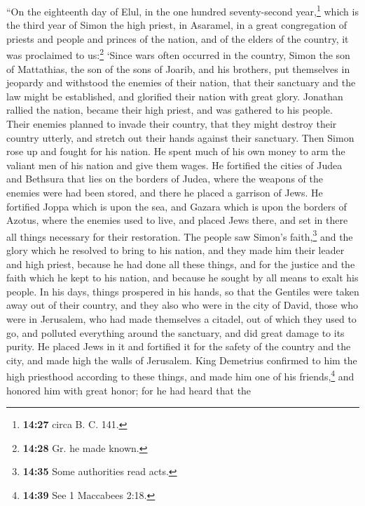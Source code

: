 ``On the eighteenth day of Elul, in the one hundred seventy-second
year,\footnote{\textbf{14:27} circa B. C. 141.} which is the third year
of Simon the high priest,  in Asaramel, in a great
congregation of priests and people and princes of the nation, and of the
elders of the country, it was proclaimed to us:\footnote{\textbf{14:28}
  Gr. he made known.}  `Since wars often occurred in the
country, Simon the son of Mattathias, the son of the sons of Joarib, and
his brothers, put themselves in jeopardy and withstood the enemies of
their nation, that their sanctuary and the law might be established, and
glorified their nation with great glory.  Jonathan
rallied the nation, became their high priest, and was gathered to his
people.  Their enemies planned to invade their country,
that they might destroy their country utterly, and stretch out their
hands against their sanctuary.  Then Simon rose up and
fought for his nation. He spent much of his own money to arm the valiant
men of his nation and give them wages.  He fortified the
cities of Judea and Bethsura that lies on the borders of Judea, where
the weapons of the enemies were had been stored, and there he placed a
garrison of Jews.  He fortified Joppa which is upon the
sea, and Gazara which is upon the borders of Azotus, where the enemies
used to live, and placed Jews there, and set in there all things
necessary for their restoration.  The people saw Simon's
faith,\footnote{\textbf{14:35} Some authorities read acts.} and the
glory which he resolved to bring to his nation, and they made him their
leader and high priest, because he had done all these things, and for
the justice and the faith which he kept to his nation, and because he
sought by all means to exalt his people.  In his days,
things prospered in his hands, so that the Gentiles were taken away out
of their country, and they also who were in the city of David, those who
were in Jerusalem, who had made themselves a citadel, out of which they
used to go, and polluted everything around the sanctuary, and did great
damage to its purity.  He placed Jews in it and fortified
it for the safety of the country and the city, and made high the walls
of Jerusalem.  King Demetrius confirmed to him the high
priesthood according to these things,  and made him one
of his friends,\footnote{\textbf{14:39} See 1 Maccabees 2:18.} and
honored him with great honor;  for he had heard that the
